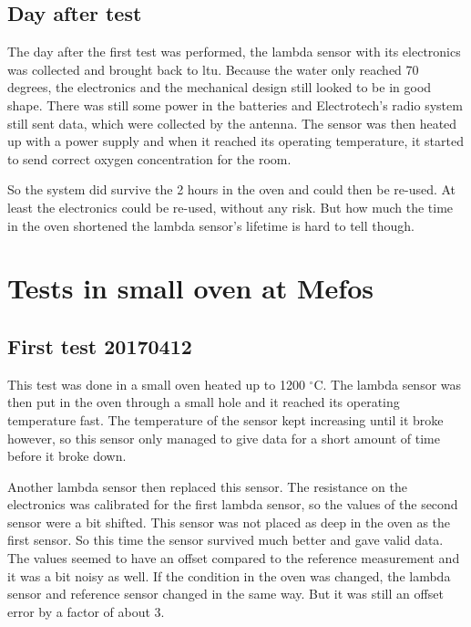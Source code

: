 \subsection{Day after test}

The day after the first test was performed, the lambda sensor with its electronics was collected and brought back to \ac{ltu}. Because the water only reached 70 degrees, the electronics and the mechanical design still looked to be in good shape. There was still some power in the batteries and Electrotech's radio system still sent data, which were collected by the antenna. The sensor was then heated up with a power supply and when it reached its operating temperature, it started to send correct oxygen concentration for the room.

So the system did survive the 2 hours in the oven and could then be re-used. At least the electronics could be re-used, without any risk. But how much the time in the oven shortened the lambda sensor's lifetime is hard to tell though.



\section{Tests in small oven at Mefos}

\subsection{First test 20170412}

This test was done in a small oven heated up to 1200 $^\circ$C. The lambda sensor was then put in the oven through a small hole and it reached its operating temperature fast. The temperature of the sensor kept increasing until it broke however, so this sensor only managed to give data for a short amount of time before it broke down.

Another lambda sensor then replaced this sensor. The resistance on the electronics was calibrated for the first lambda sensor, so the values of the second sensor were a bit shifted. This sensor was not placed as deep in the oven as the first sensor. So this time the sensor survived much better and gave valid data. The values seemed to have an offset compared to the reference measurement and it was a bit noisy as well. If the condition in the oven was changed, the lambda sensor and reference sensor changed in the same way. But it was still an offset error by a factor of about 3.

